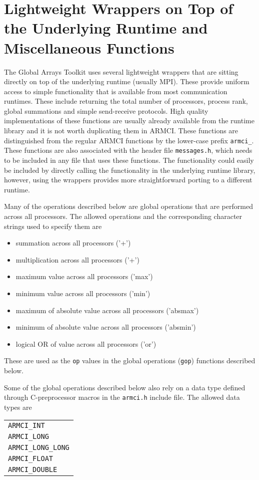 \documentclass[12pt]{article}
\begin{document}
\section{Lightweight Wrappers on Top of the Underlying Runtime and Miscellaneous
Functions}
The Global Arrays Toolkit uses several lightweight wrappers that are sitting
directly on top of the underlying runtime (usually MPI). These provide uniform
access to simple functionality that is available from most communication
runtimes. These include returning the total number of processors, process rank,
global summations and simple send-receive protocols. High quality
implementations of these functions are usually already available from the
runtime library and it is not worth duplicating them in ARMCI. These functions
are distinguished from the regular ARMCI functions by the lower-case prefix
\texttt{armci\_}. These functions are also associated with the header file
\texttt{messages.h}, which needs to be included in any file that uses these
functions. The functionality could easily be included by directly calling the
functionality in the underlying runtime library, however, using the wrappers
provides more straightforward porting to a different runtime.

Many of the operations described below are global operations that are performed
across all processors. The allowed operations and the corresponding character
strings used to specify them are 
\begin{itemize}
\item summation across all processors ('+')
\item multiplication across all processors ('+')
\item maximum value across all processors ('max')
\item minimum value across all processors ('min')
\item maximum of absolute value across all processors ('absmax')
\item minimum of absolute value across all processors ('absmin')
\item logical OR of value across all processors ('or')
\end{itemize}
These are used as the \texttt{op} values in the global operations (\texttt{gop})
functions described below.

Some of the global operations described below also rely on a data type defined
through C-preprocessor macros in the \texttt{armci.h} include file. The allowed
data types are
\newline
\begin{center}
\begin{tabular}{l}
\texttt{ARMCI\_INT} \\
\texttt{ARMCI\_LONG} \\
\texttt{ARMCI\_LONG\_LONG} \\
\texttt{ARMCI\_FLOAT} \\
\texttt{ARMCI\_DOUBLE}
\end{tabular}
\newline
\end{center}
\end{document}
